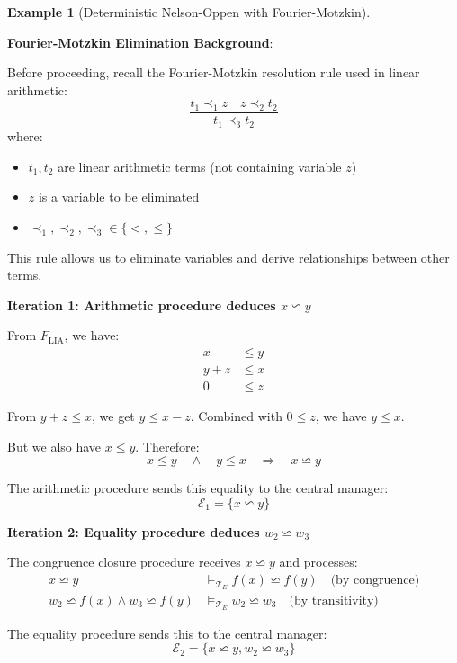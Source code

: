 \documentclass[11pt,a4paper]{article}
\theoremstyle{definition}
\newtheorem{example}{Example}[section]
\theoremstyle{plain}
\theoremstyle{remark}
\begin{document}
\begin{example}[Deterministic Nelson-Oppen with Fourier-Motzkin]
\begin{tcolorbox}[colback=blue!5!white,colframe=blue!75!black,title=\textbf{Example 2: UNSAT with Equality Propagation},breakable]
\vspace{0.3em}

\textbf{Fourier-Motzkin Elimination Background}:

Before proceeding, recall the Fourier-Motzkin resolution rule used in linear arithmetic:
\[
\frac{t_1 \prec_1 z \quad z \prec_2 t_2}{t_1 \prec_3 t_2}
\]
where:
\begin{itemize}
    \item $t_1, t_2$ are linear arithmetic terms (not containing variable $z$)
    \item $z$ is a variable to be eliminated
    \item $\prec_1, \prec_2, \prec_3 \in \{<, \leq\}$
\end{itemize}

This rule allows us to eliminate variables and derive relationships between other terms.

\vspace{0.3em}

\textbf{Iteration 1: Arithmetic procedure deduces $x \backsimeq y$}

From $F_{\text{LIA}}$, we have:
\begin{align*}
x &\leq y \\
y + z &\leq x \\
0 &\leq z
\end{align*}

From $y + z \leq x$, we get $y \leq x - z$. Combined with $0 \leq z$, we have $y \leq x$.

But we also have $x \leq y$. Therefore:
\[
x \leq y \quad \wedge \quad y \leq x \quad \Rightarrow \quad x \backsimeq y
\]

The arithmetic procedure sends this equality to the central manager:
\[
\mathcal{E}_1 = \{x \backsimeq y\}
\]

\vspace{0.3em}

\textbf{Iteration 2: Equality procedure deduces $w_2 \backsimeq w_3$}

The congruence closure procedure receives $x \backsimeq y$ and processes:
\begin{align*}
x \backsimeq y &\models_{\mathcal{T}_E} f(x) \backsimeq f(y) \quad \text{(by congruence)} \\
w_2 \backsimeq f(x) \wedge w_3 \backsimeq f(y) &\models_{\mathcal{T}_E} w_2 \backsimeq w_3 \quad \text{(by transitivity)}
\end{align*}

The equality procedure sends this to the central manager:
\[
\mathcal{E}_2 = \{x \backsimeq y, w_2 \backsimeq w_3\}
\]


\end{tcolorbox}
\end{example}
\end{document}
